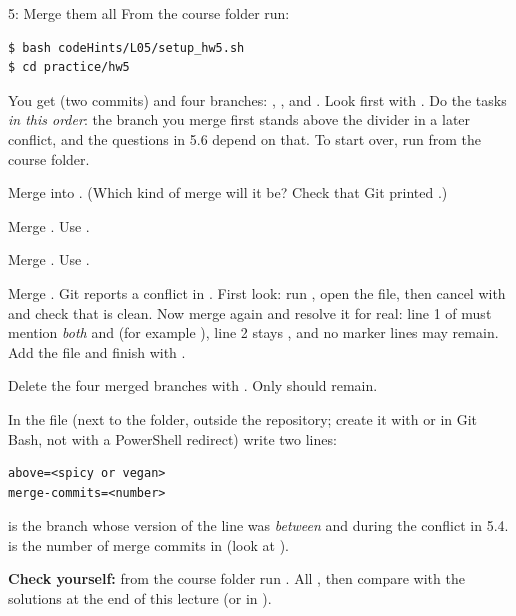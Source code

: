 \begin{homework}{5: Merge them all}
From the course folder run:
\begin{lstlisting}
$ bash codeHints/L05/setup_hw5.sh
$ cd practice/hw5
\end{lstlisting}
You get  (two commits) and four branches: , ,  and . Look first with . Do the tasks \emph{in this order}: the branch you merge first stands above the \code{=======} divider in a later conflict, and the questions in 5.6 depend on that. To start over, run  from the course folder.

\begin{description}[leftmargin=1.2em,style=nextline]
\item[5.1 First merge] Merge  into . (Which kind of merge will it be? Check that Git printed .)
\item[5.2 Second merge] Merge . Use .
\item[5.3 Third merge] Merge . Use .
\item[5.4 The conflict] Merge . Git reports a conflict in . First look: run , open the file, then cancel with  and check that  is clean. Now merge  again and resolve it for real: line 1 of  must mention \emph{both}  and  (for example ), line 2 stays , and no marker lines may remain. Add the file and finish with .
\item[5.5 Clean up] Delete the four merged branches with . Only  should remain.
\item[5.6 Questions] In the file  (next to the  folder, outside the repository; create it with  or  in Git Bash, not with a PowerShell redirect) write two lines:
\begin{lstlisting}
above=<spicy or vegan>
merge-commits=<number>
\end{lstlisting}
 is the branch whose version of the line was \emph{between}  and \code{=======} during the conflict in 5.4.  is the number of merge commits in  (look at ).
\end{description}

\textbf{Check yourself:} from the course folder run . All , then compare with the solutions at the end of this lecture (or in ).
\end{homework}


